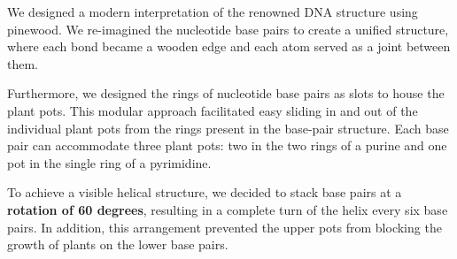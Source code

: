 \documentclass[12pt]{extarticle} %
\begin{document}
We designed a modern interpretation of the renowned DNA structure using pinewood. We re-imagined the nucleotide base pairs to create a unified structure, where each bond became a wooden edge and each atom served as a joint between them.

Furthermore, we designed the rings of nucleotide base pairs as slots to house the plant pots. This modular approach facilitated easy sliding in and out of the individual plant pots from the rings present in the base-pair structure. Each base pair can accommodate three plant pots: two in the two rings of a purine and one pot in the single ring of a pyrimidine.

To achieve a visible helical structure, we decided to stack base pairs at a \textbf{rotation of 60 degrees}, resulting in a complete turn of the helix every six base pairs. In addition, this arrangement prevented the upper pots from blocking the growth of plants on the lower base pairs.
\end{document}
